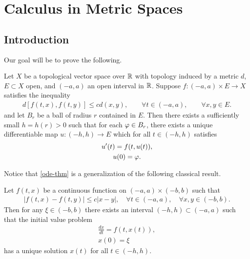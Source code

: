 \chapter{Calculus in Metric Spaces}
\section{Introduction}
%
%
%
%
%
%
%
%
%
%
%
Our goal will be to prove the following.
%
%
%
%
%
%
%
%
\begin{theorem}
	\label{ode-thm}
  Let $X$ be a topological vector space over $\mathbb{R}$
  with topology induced by a metric $d$, $E \subset X$ open, and $(-a, a)$ an
	open interval in $\mathbb{R}$. Suppose $f: (-a, a) \times E \to X$ satisfies the
	inequality
	\begin{equation}
		\label{stronger-ode}
		\begin{split}
      d[f(t, x), f(t, y)] \le c d(x, y), \qquad \forall t \in (-a, a),
			\qquad \forall x, y \in E.
		\end{split}
	\end{equation}
  and let $B_{r}$ be a ball of radius $r$ contained in $E$. Then there exists a
  sufficiently small $h = h(r) > 0$ such that for each $\varphi \in B_{r}$, there
  exists a unique differentiable map $u: (-h, h) \to E$ which for all $t \in
  (-h, h)$ satisfies
	\begin{gather}
    \label{ode-thm-eq}
			u'(t) = f(t, u(t)),
			\\
      \label{ode-thm-init-data}
			u(0) = \varphi.
	\end{gather}
\end{theorem}
%
%
Notice that \autoref{ode-thm} is a 
generalization of the following classical result.
%
%
%
%
%
%
%
%
\begin{theorem}
	Let $f(t, x)$ be a continuous function on $(- a, a) \times (- b,
	b)$ such that
	\begin{equation*}
		\begin{split}
			| f(t, x) - f(t, y) | \le c| x - y |, \quad \forall t \in (-a, a),
			\quad \forall x,y \in (- b, b).
		\end{split}
	\end{equation*}
	Then for any $\xi \in (-b, b)$ there exists an interval $(-h, h)
	\subset (-a, a)$ such that the initial value problem
	\begin{gather}
			\frac{dx}{dt} = f(t, x(t)),
			\\
			x(0) = \xi 
	\end{gather}
	has a unique solution $x(t)$ for all $t \in (-h, h)$.
	\end{theorem}
